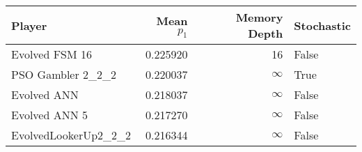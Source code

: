 \begin{tabular}{lrrl}
\toprule
               Player &  Mean $p_1$ &  Memory Depth & Stochastic \\
\midrule
       Evolved FSM 16 &    0.225920 &            16 &      False \\
    PSO Gambler 2\_2\_2 &    0.220037 &            \(\infty\) &       True \\
          Evolved ANN &    0.218037 &            \(\infty\) &      False \\
        Evolved ANN 5 &    0.217270 &            \(\infty\) &      False \\
 EvolvedLookerUp2\_2\_2 &    0.216344 &            \(\infty\) &      False \\
\bottomrule
\end{tabular}
